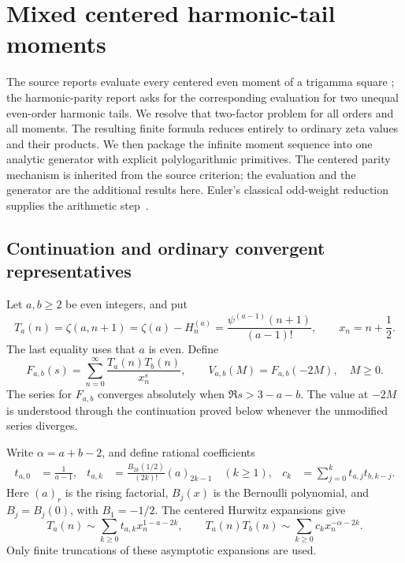 \section{Mixed centered harmonic-tail moments}
\label{mt:section}

The source reports evaluate every centered even moment of a trigamma
square \cite{IncomingHigherReflection,IncomingParity}; the harmonic-parity
report asks for the corresponding evaluation for two unequal even-order
harmonic tails. We resolve that two-factor problem for all
orders and all moments. The resulting finite formula reduces entirely to
ordinary zeta values and their products. We then package the infinite
moment sequence into one analytic generator with explicit
polylogarithmic primitives. The centered parity mechanism is inherited
from the source criterion; the evaluation and the generator are the
additional results here. Euler's classical odd-weight reduction supplies
the arithmetic step~\cite{Bradley2007}.

\subsection{Continuation and ordinary convergent representatives}

Let $a,b\ge2$ be even integers, and put
\begin{equation}\label{mt:notation}
 T_a(n)=\zeta(a,n+1)=\zeta(a)-H_n^{(a)}
       =\frac{\psi^{(a-1)}(n+1)}{(a-1)!},
 \qquad x_n=n+\frac12.
\end{equation}
The last equality uses that $a$ is even. Define
\begin{equation}\label{mt:F}
 F_{a,b}(s)=\sum_{n=0}^{\infty}\frac{T_a(n)T_b(n)}{x_n^s},
 \qquad V_{a,b}(M)=F_{a,b}(-2M),\quad M\ge0.
\end{equation}
The series for $F_{a,b}$ converges absolutely when
$\Re s>3-a-b$. The value at $-2M$ is understood through the continuation
proved below whenever the unmodified series diverges.

Write $\alpha=a+b-2$, and define rational coefficients
\begin{align}
 t_{a,0}&=\frac1{a-1},&
 t_{a,k}&=\frac{B_{2k}(1/2)}{(2k)!}(a)_{2k-1}\quad(k\ge1),
 &c_k&=\sum_{j=0}^k t_{a,j}t_{b,k-j}.
 \label{mt:centered-coefficients}
\end{align}
Here $(a)_r$ is the rising factorial, $B_j(x)$ is the Bernoulli
polynomial, and $B_j=B_j(0)$, with $B_1=-1/2$.
The centered Hurwitz expansions \cite[\S25.11(xii)]{DLMFHurwitz} give
\begin{equation}\label{mt:centered-expansion}
 T_a(n)\sim\sum_{k\ge0}t_{a,k}x_n^{1-a-2k},
 \qquad
 T_a(n)T_b(n)\sim\sum_{k\ge0}c_kx_n^{-\alpha-2k}.
\end{equation}
Only finite truncations of these asymptotic expansions are used.


